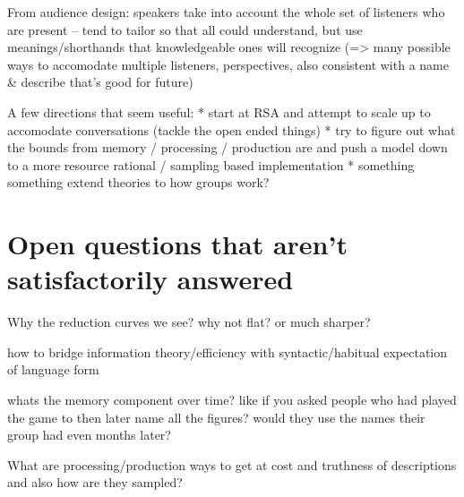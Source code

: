 \documentclass[]{article}
\begin{document}
From audience design: speakers take into account the whole set of listeners who are present -- tend to tailor so that all could understand, but use meanings/shorthands that knowledgeable ones will recognize (=> many possible ways to accomodate multiple listeners, perspectives, also consistent with a name \& describe that's good for future) 





A few directions that seem useful:
* start at RSA and attempt to scale up to accomodate conversations (tackle the open ended things)
* try to figure out what the bounds from memory / processing / production are and push a model down to a more resource rational / sampling based implementation
* something something extend theories to how groups work?



\section{Open questions that aren't satisfactorily answered}

Why the reduction curves we see? why not flat? or much sharper? 

how to bridge information theory/efficiency with syntactic/habitual expectation of language form 

whats the memory component over time? like if you asked people who had played the game to then later name all the figures? would they use the names their group had even months later? 

What are processing/production ways to get at cost and truthness of descriptions and also how are they sampled? 














\end{document}
